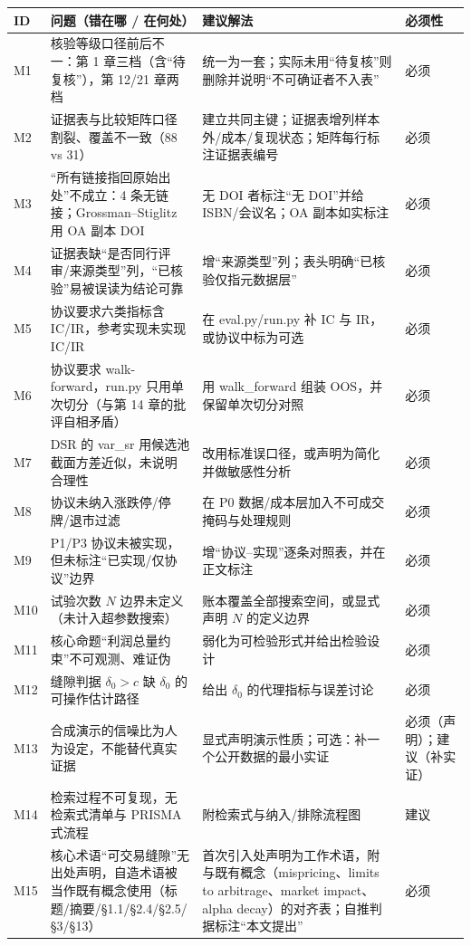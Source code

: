\documentclass[11pt,a4paper]{ctexart}
\begin{document}
\begin{longtable}{@{}>{\raggedright\arraybackslash}p{0.9cm}>{\raggedright\arraybackslash}p{5.3cm}>{\raggedright\arraybackslash}p{5.3cm}>{\raggedright\arraybackslash}p{1.9cm}@{}}
\toprule
ID & 问题（错在哪 / 在何处） & 建议解法 & 必须性 \\
\midrule
\endhead
M1 & 核验等级口径前后不一：第 1 章三档（含“待复核”），第 12/21 章两档 & 统一为一套；实际未用“待复核”则删除并说明“不可确证者不入表” & 必须 \\
M2 & 证据表与比较矩阵口径割裂、覆盖不一致（88 vs 31） & 建立共同主键；证据表增列样本外/成本/复现状态；矩阵每行标注证据表编号 & 必须 \\
M3 & “所有链接指回原始出处”不成立：4 条无链接；Grossman--Stiglitz 用 OA 副本 DOI & 无 DOI 者标注“无 DOI”并给 ISBN/会议名；OA 副本如实标注 & 必须 \\
M4 & 证据表缺“是否同行评审/来源类型”列，“已核验”易被误读为结论可靠 & 增“来源类型”列；表头明确“已核验仅指元数据层” & 必须 \\
M5 & 协议要求六类指标含 IC/IR，参考实现未实现 IC/IR & 在 eval.py/run.py 补 IC 与 IR，或协议中标为可选 & 必须 \\
M6 & 协议要求 walk-forward，run.py 只用单次切分（与第 14 章的批评自相矛盾） & 用 walk\_forward 组装 OOS，并保留单次切分对照 & 必须 \\
M7 & DSR 的 var\_sr 用候选池截面方差近似，未说明合理性 & 改用标准误口径，或声明为简化并做敏感性分析 & 必须 \\
M8 & 协议未纳入涨跌停/停牌/退市过滤 & 在 P0 数据/成本层加入不可成交掩码与处理规则 & 必须 \\
M9 & P1/P3 协议未被实现，但未标注“已实现/仅协议”边界 & 增“协议--实现”逐条对照表，并在正文标注 & 必须 \\
M10 & 试验次数 $N$ 边界未定义（未计入超参数搜索） & 账本覆盖全部搜索空间，或显式声明 $N$ 的定义边界 & 必须 \\
M11 & 核心命题“利润总量约束”不可观测、难证伪 & 弱化为可检验形式并给出检验设计 & 必须 \\
M12 & 缝隙判据 $\delta_0>c$ 缺 $\delta_0$ 的可操作估计路径 & 给出 $\delta_0$ 的代理指标与误差讨论 & 必须 \\
M13 & 合成演示的信噪比为人为设定，不能替代真实证据 & 显式声明演示性质；可选：补一个公开数据的最小实证 & 必须（声明）；建议（补实证） \\
M14 & 检索过程不可复现，无检索式清单与 PRISMA 式流程 & 附检索式与纳入/排除流程图 & 建议 \\
M15 & 核心术语“可交易缝隙”无出处声明，自造术语被当作既有概念使用（标题/摘要/§1.1/§2.4/§2.5/§3/§13） & 首次引入处声明为工作术语，附与既有概念（mispricing、limits to arbitrage、market impact、alpha decay）的对齐表；自推判据标注“本文提出” & 必须 \\
\bottomrule
\end{longtable}
\end{document}
